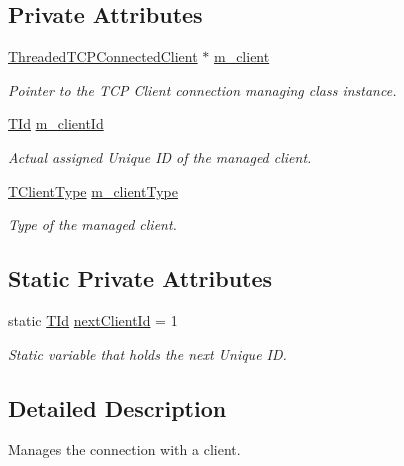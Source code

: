 \subsection*{Private Attributes}
\begin{DoxyCompactItemize}
\item 
\hyperlink{class_threaded_t_c_p_connected_client}{Threaded\-T\-C\-P\-Connected\-Client} $\ast$ \hyperlink{class_client_manager_a86ae04f2ac9f2988559a023d877f78e4}{m\-\_\-client}
\begin{DoxyCompactList}\small\item\em Pointer to the T\-C\-P Client connection managing class instance. \end{DoxyCompactList}\item 
\hyperlink{class_client_manager_a531e5e7eb779e8ce3c47b8eabd8e9b17}{T\-Id} \hyperlink{class_client_manager_a1216ffa88107c33825adafe63fea2263}{m\-\_\-client\-Id}
\begin{DoxyCompactList}\small\item\em Actual assigned Unique I\-D of the managed client. \end{DoxyCompactList}\item 
\hyperlink{class_client_manager_a223aecacabe855f08e4675b12403dfa4}{T\-Client\-Type} \hyperlink{class_client_manager_af40c31ade3f23b705bce2a8b3d311ce6}{m\-\_\-client\-Type}
\begin{DoxyCompactList}\small\item\em Type of the managed client. \end{DoxyCompactList}\end{DoxyCompactItemize}
\subsection*{Static Private Attributes}
\begin{DoxyCompactItemize}
\item 
static \hyperlink{class_client_manager_a531e5e7eb779e8ce3c47b8eabd8e9b17}{T\-Id} \hyperlink{class_client_manager_a4f044df4d9f43367135f9d01841ec326}{next\-Client\-Id} = 1
\begin{DoxyCompactList}\small\item\em Static variable that holds the next Unique I\-D. \end{DoxyCompactList}\end{DoxyCompactItemize}


\subsection{Detailed Description}
Manages the connection with a client. 

